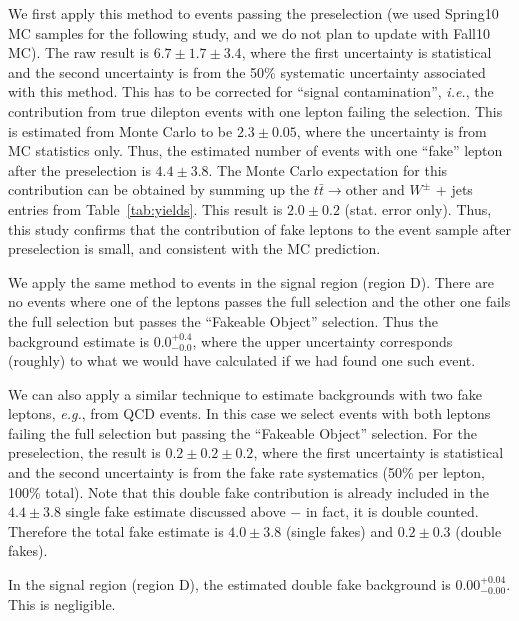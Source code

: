 We first apply this method to events passing the preselection (we used
Spring10 MC samples for the following study, and we do not plan to update with Fall10
MC). The raw result is $6.7 \pm 1.7 \pm 3.4$, where the first uncertainty is 
statistical and the second uncertainty is from the 50\% systematic 
uncertainty associated with this method\cite{ref:FR}.  This has 
to be corrected for ``signal contamination'', {\em i.e.}, the 
contribution from true dilepton events with one lepton 
failing the selection.  This is estimated from Monte Carlo 
to be $2.3 \pm 0.05$, where the uncertainty is from MC statistics
only. Thus, the estimated number of events with one ``fake''
lepton after the preselection is $4.4 \pm 3.8$.  
The Monte Carlo expectation for this contribution can be obtained
by summing up the $t\bar{t}\rightarrow \mathrm{other}$ and
$W^{\pm}$ + jets entries from Table~\ref{tab:yields}.  This 
result is $2.0 \pm 0.2$ (stat. error only).  Thus, this study
confirms that the contribution of fake leptons to the event sample
after preselection is small, and consistent with the MC prediction.

We apply the same method to events in the signal region (region D).  
There are no events where one of the leptons passes the full selection and 
the other one fails the full selection but passes the 
``Fakeable Object'' selection.  Thus the background estimate
is $0.0^{+0.4}_{-0.0}$, where the upper uncertainty corresponds (roughly)
to what we would have calculated if we had found one such event.

We can also apply a similar technique to estimate backgrounds
with two fake leptons, {\em e.g.}, from QCD events.
In this case we select events with both
leptons failing the full selection but passing the 
``Fakeable Object'' selection.  For the preselection, the 
result is $0.2 \pm 0.2 \pm 0.2$, where the first uncertainty
is statistical and the second uncertainty is from the fake rate
systematics (50\% per lepton, 100\% total).  Note that this 
double fake contribution is already included in the $4.4 \pm 3.8$ 
single fake estimate discussed above $-$ in fact, it is double counted.  
Therefore the total fake estimate is $4.0 \pm 3.8$ (single fakes)
and $0.2 \pm 0.3$ (double fakes).

In the signal region (region D), the estimated double fake background
is $0.00^{+0.04}_{-0.00}$.  This is negligible.